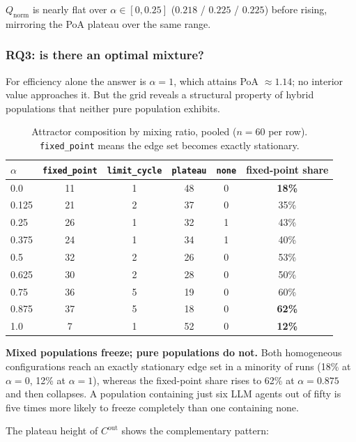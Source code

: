 $Q_{\mathrm{norm}}$ is nearly flat over $\alpha \in [0, 0.25]$ ($0.218$ / $0.225$ /
$0.225$) before rising, mirroring the PoA plateau over the same range.

\subsubsection{RQ3: is there an optimal mixture?}
\label{sec:res-rq3}

For efficiency alone the answer is $\alpha = 1$, which attains PoA $\approx 1.14$; no
interior value approaches it. But the grid reveals a structural property of hybrid
populations that neither pure population exhibits.

\begin{table}[t]
\centering
\caption{Attractor composition by mixing ratio, pooled ($n = 60$ per row).
\texttt{fixed\_point} means the edge set becomes exactly stationary.}
\label{tab:attractor}
\begin{tabular}{lccccc}
\toprule
$\alpha$ & \texttt{fixed\_point} & \texttt{limit\_cycle} & \texttt{plateau} & \texttt{none} & fixed-point share \\
\midrule
0.0   & 11 & 1 & 48 & 0 & \textbf{18\%} \\
0.125 & 21 & 2 & 37 & 0 & 35\% \\
0.25  & 26 & 1 & 32 & 1 & 43\% \\
0.375 & 24 & 1 & 34 & 1 & 40\% \\
0.5   & 32 & 2 & 26 & 0 & 53\% \\
0.625 & 30 & 2 & 28 & 0 & 50\% \\
0.75  & 36 & 5 & 19 & 0 & 60\% \\
0.875 & 37 & 5 & 18 & 0 & \textbf{62\%} \\
1.0   & 7  & 1 & 52 & 0 & \textbf{12\%} \\
\bottomrule
\end{tabular}
\end{table}

\textbf{Mixed populations freeze; pure populations do not.} Both homogeneous
configurations reach an exactly stationary edge set in a minority of runs (18\% at
$\alpha = 0$, 12\% at $\alpha = 1$), whereas the fixed-point share rises to 62\% at
$\alpha = 0.875$ and then collapses. A population containing just six LLM agents out of
fifty is five times more likely to freeze completely than one containing none.

The plateau height of $C^{\mathrm{out}}$ shows the complementary pattern:

